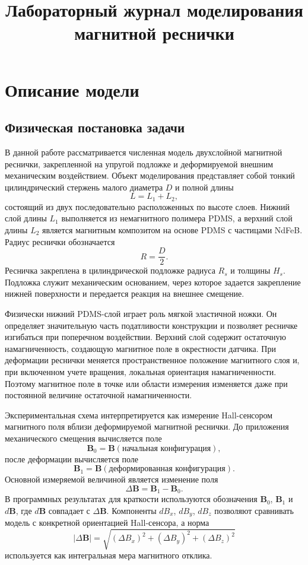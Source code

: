 \documentclass[12pt,a4paper]{article}
\title{Лабораторный журнал моделирования магнитной реснички}
\author{}
\date{}
\begin{document}
\maketitle

\section{Описание модели}

\subsection{Физическая постановка задачи}

В данной работе рассматривается численная модель двухслойной магнитной
реснички, закрепленной на упругой подложке и деформируемой внешним механическим
воздействием. Объект моделирования представляет собой тонкий цилиндрический
стержень малого диаметра \(D\) и полной длины
\[
    L = L_1 + L_2,
\]
состоящий из двух последовательно расположенных по высоте слоев. Нижний слой
длины \(L_1\) выполняется из немагнитного полимера PDMS, а верхний слой длины
\(L_2\) является магнитным композитом на основе PDMS с частицами NdFeB. Радиус
реснички обозначается
\[
    R = \frac{D}{2}.
\]
Ресничка закреплена в цилиндрической подложке радиуса \(R_s\) и толщины
\(H_s\). Подложка служит механическим основанием, через которое задается
закрепление нижней поверхности и передается реакция на внешнее смещение.

Физически нижний PDMS-слой играет роль мягкой эластичной ножки. Он определяет
значительную часть податливости конструкции и позволяет ресничке изгибаться при
поперечном воздействии. Верхний слой содержит остаточную намагниченность,
создающую магнитное поле в окрестности датчика. При деформации реснички меняется
пространственное положение магнитного слоя и, при включенном учете вращения,
локальная ориентация намагниченности. Поэтому магнитное поле в точке или области
измерения изменяется даже при постоянной величине остаточной намагниченности.

Экспериментальная схема интерпретируется как измерение Hall-сенсором магнитного
поля вблизи деформируемой магнитной реснички. До приложения механического
смещения вычисляется поле
\[
    \mathbf B_0 = \mathbf B(\text{начальная конфигурация}),
\]
после деформации вычисляется поле
\[
    \mathbf B_1 = \mathbf B(\text{деформированная конфигурация}).
\]
Основной измеряемой величиной является изменение поля
\[
    \Delta \mathbf B = \mathbf B_1 - \mathbf B_0.
\]
В программных результатах для краткости используются обозначения
\(\mathbf B_0\), \(\mathbf B_1\) и \(d\mathbf B\), где \(d\mathbf B\) совпадает с
\(\Delta \mathbf B\). Компоненты \(dB_x\), \(dB_y\), \(dB_z\) позволяют сравнивать
модель с конкретной ориентацией Hall-сенсора, а норма
\[
    |\Delta \mathbf B| =
    \sqrt{(\Delta B_x)^2 + (\Delta B_y)^2 + (\Delta B_z)^2}
\]
используется как интегральная мера магнитного отклика.
\end{document}

